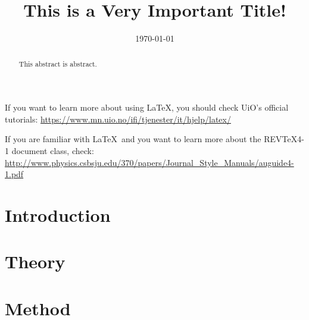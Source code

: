 \documentclass[reprint,english,notitlepage]{revtex4-1}  %
\begin{document}
\title{This is a Very Important Title!}   %
\author{}               %
\date{\today}                             %
\noaffiliation                            %
\begin{abstract}                          %
This abstract is abstract.                %
\end{abstract}                            %
\maketitle                                %

If you want to learn more about using \LaTeX, you should check UiO's official tutorials:
\url{https://www.mn.uio.no/ifi/tjenester/it/hjelp/latex/}

If you are familiar with \LaTeX\ and you want to learn more about the REVTeX4-1 document class, check:
\url{http://www.physics.csbsju.edu/370/papers/Journal_Style_Manuals/auguide4-1.pdf}


\section{Introduction}
\section{Theory}   %
\section{Method}
\end{document}
